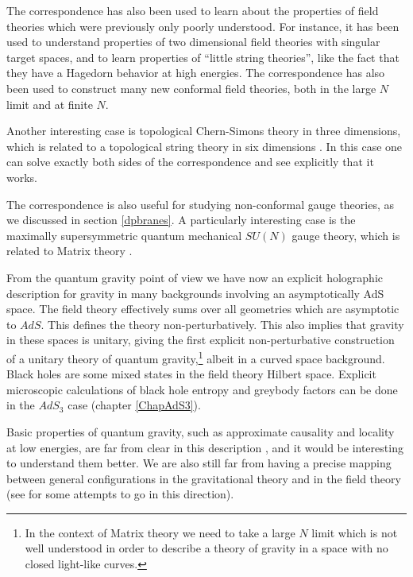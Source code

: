 The correspondence has also been used to learn about the properties of
field theories which were previously only poorly understood. For
instance, it has been used \cite{Seiberg:1999xz} to understand
properties of two dimensional field theories with singular target
spaces, and to learn properties of ``little string theories'', like
the fact that they have a Hagedorn behavior at high energies. The
correspondence has also been used to construct many new conformal
field theories, both in the large $N$ limit and at finite $N$.

Another interesting case is topological Chern-Simons 
theory in three dimensions, which is related to a topological
string theory in six dimensions \cite{Gopakumar:1998ki}. In this
case one can solve exactly both sides of the correspondence and
see explicitly that it works.

The correspondence is also useful for studying non-conformal 
gauge theories,
as we discussed in section \ref{dpbranes}. A particularly interesting
case is the maximally supersymmetric quantum mechanical $SU(N)$ gauge
theory, which is related
to Matrix theory \cite{Banks:1997vh,Balasubramanian:1997kd,
Hyun:1998bi,Itzhaki:1998sa,McCarthy:1998uw,
deAlwis:1999ki,Silva:1998nk,Chepelev:1999pm,
Yoneya:1999zi,Townsend:1998qp,
Polchinski:1999br}.

From the quantum gravity point of view we have now an explicit
holographic description for gravity in many backgrounds involving 
an asymptotically AdS space. 
The field theory effectively sums over all geometries which are 
asymptotic to $AdS$. This defines the theory non-perturbatively. 
This also implies that gravity in these spaces is unitary, giving the
first explicit non-perturbative
construction of a unitary theory of quantum gravity,\footnote{In
the context of Matrix theory \cite{Banks:1997vh} we need to take a
large $N$ limit which is not well understood in order 
to describe a theory of gravity in a space with no
closed light-like curves.} albeit in a curved space background. 
Black holes are some  mixed states in the field theory Hilbert space.
Explicit microscopic 
calculations of black hole entropy and greybody factors
can be done in the $AdS_3$ case (chapter \ref{ChapAdS3}). 

Basic properties of quantum gravity, such as approximate causality and
locality at low energies, 
are far from clear in this description \cite{Horowitz:1998pq,Banks:1998dd,
Das:1999fx,Horowitz:1999gf,Kabat:1999yq,Bak:1999iq,Lowe:1999pk}, and it would
be interesting to understand them better. We are also still far from
having a precise mapping between general configurations in the
gravitational theory and in the field theory (see \cite{Berkooz:1998wv,
Balasubramanian:1999ri}
for some attempts to go in this direction).

